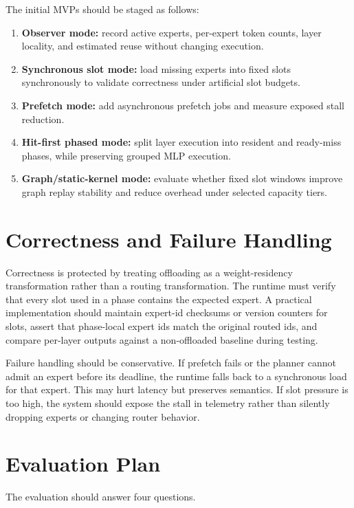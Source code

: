 \documentclass[10pt]{article}
\begin{document}
The initial MVPs should be staged as follows:

\begin{enumerate}[leftmargin=*]
  \item \textbf{Observer mode:} record active experts, per-expert token counts,
  layer locality, and estimated reuse without changing execution.
  \item \textbf{Synchronous slot mode:} load missing experts into fixed slots
  synchronously to validate correctness under artificial slot budgets.
  \item \textbf{Prefetch mode:} add asynchronous prefetch jobs and measure
  exposed stall reduction.
  \item \textbf{Hit-first phased mode:} split layer execution into resident and
  ready-miss phases, while preserving grouped MLP execution.
  \item \textbf{Graph/static-kernel mode:} evaluate whether fixed slot windows
  improve graph replay stability and reduce overhead under selected capacity
  tiers.
\end{enumerate}

\section{Correctness and Failure Handling}

Correctness is protected by treating offloading as a weight-residency
transformation rather than a routing transformation. The runtime must verify
that every slot used in a phase contains the expected expert. A practical
implementation should maintain expert-id checksums or version counters for
slots, assert that phase-local expert ids match the original routed ids, and
compare per-layer outputs against a non-offloaded baseline during testing.

Failure handling should be conservative. If prefetch fails or the planner
cannot admit an expert before its deadline, the runtime falls back to a
synchronous load for that expert. This may hurt latency but preserves semantics.
If slot pressure is too high, the system should expose the stall in telemetry
rather than silently dropping experts or changing router behavior.

\section{Evaluation Plan}

The evaluation should answer four questions.
\end{document}
